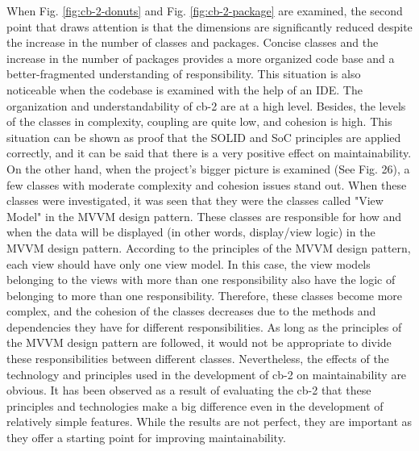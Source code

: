 When Fig. \ref{fig:cb-2-donuts} and Fig. \ref{fig:cb-2-package} are examined, the second point that draws attention is that the dimensions are significantly reduced despite the increase in the number of classes and packages. Concise classes and the increase in the number of packages provides a more organized code base and a better-fragmented understanding of responsibility. This situation is also noticeable when the codebase is examined with the help of an IDE. The organization and understandability of cb-2 are at a high level. Besides, the levels of the classes in complexity, coupling are quite low, and cohesion is high. This situation can be shown as proof that the SOLID and SoC principles are applied correctly, and it can be said that there is a very positive effect on maintainability. On the other hand, when the project's bigger picture is examined (See Fig. 26), a few classes with moderate complexity and cohesion issues stand out. When these classes were investigated, it was seen that they were the classes called "View Model" in the MVVM design pattern. These classes are responsible for how and when the data will be displayed (in other words, display/view logic) in the MVVM design pattern. According to the principles of the MVVM design pattern, each view should have only one view model. In this case, the view models belonging to the views with more than one responsibility also have the logic of belonging to more than one responsibility. Therefore, these classes become more complex, and the cohesion of the classes decreases due to the methods and dependencies they have for different responsibilities. As long as the principles of the MVVM design pattern are followed, it would not be appropriate to divide these responsibilities between different classes. Nevertheless, the effects of the technology and principles used in the development of cb-2 on maintainability are obvious. It has been observed as a result of evaluating the cb-2 that these principles and technologies make a big difference even in the development of relatively simple features. While the results are not perfect, they are important as they offer a starting point for improving maintainability.